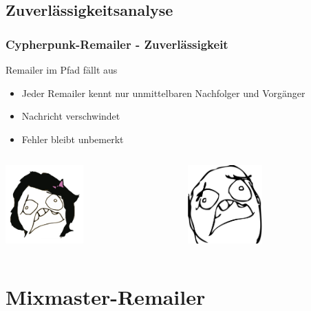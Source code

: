 \documentclass{beamer}
\begin{document}
\subsection{Zuverlässigkeitsanalyse}
\begin{frame}
	\frametitle{Cypherpunk-Remailer - Zuverlässigkeit}
	\begin{alertblock}{Remailer im Pfad fällt aus}	
		\begin{itemize}	
			\item Jeder Remailer kennt nur unmittelbaren Nachfolger und Vorgänger
			\item Nachricht verschwindet
			\item Fehler bleibt unbemerkt
		\end{itemize}	
	\end{alertblock}


	\begin{columns}[T]
		\begin{column}[T]{5cm}
			\begin{center}
				\includegraphics[height=3cm]{bilder/alice_sad.jpg}
			\end{center}
		\end{column}
		\begin{column}[T]{5cm}
			\begin{center}	
				\includegraphics[height=3cm]{bilder/bob_sad.jpg}
			\end{center}
		\end{column}
	\end{columns}	
\end{frame}

\section{Mixmaster-Remailer}
\end{document}
